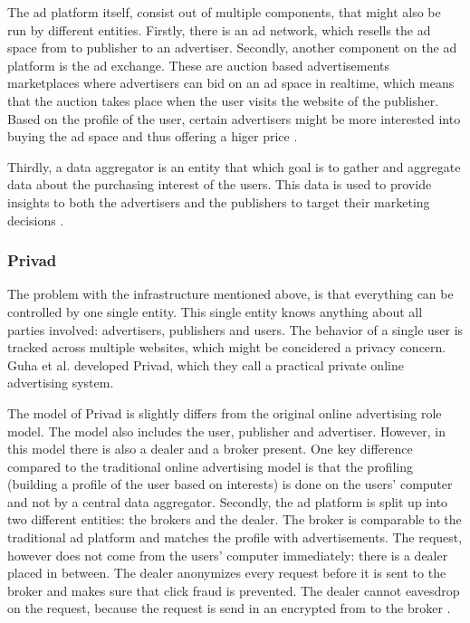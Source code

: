 The ad platform itself, consist out of multiple components, that might also be run by different entities. Firstly, there is an ad network, which resells the ad space from to publisher to an advertiser. Secondly, another component on the ad platform is the ad exchange. These are auction based advertisements marketplaces where advertisers can bid on an ad space in realtime, which means that the auction takes place when the user visits the website of the publisher. Based on the profile of the user, certain advertisers might be more interested into buying the ad space and thus offering a higer price \cite{estrada2017online}. 

Thirdly, a data aggregator is an entity that which goal is to gather and aggregate data about the purchasing interest of the users. This data is used to provide insights to both the advertisers and the publishers to target their marketing decisions \cite{estrada2017online}.

\subsubsection{Privad}
The problem with the infrastructure mentioned above, is that everything can be controlled by one single entity. This single entity knows anything about all parties involved: advertisers, publishers and users. The behavior of a single user is tracked across multiple websites, which might be concidered a privacy concern. Guha et al. \cite{guha2011privad} developed Privad, which they call a practical private online advertising system. 

The model of Privad is slightly differs from the original online advertising role model. The model also includes the user, publisher and advertiser. However, in this model there is also a dealer and a broker present. One key difference compared to the traditional online advertising model is that the profiling (building a profile of the user based on interests) is done on the users' computer and not by a central data aggregator. Secondly, the ad platform is split up into two different entities: the brokers and the dealer. The broker is comparable to the traditional ad platform and matches the profile with advertisements. The request, however does not come from the users' computer immediately: there is a dealer placed in between. The dealer anonymizes every request before it is sent to the broker and makes sure that click fraud is prevented. The dealer cannot eavesdrop on the request, because the request is send in an encrypted from to the broker \cite{guha2011privad}. 

